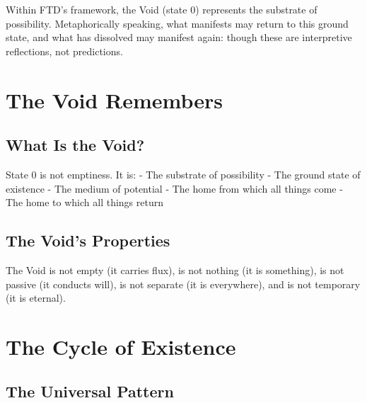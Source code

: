 \documentclass[
  11pt,
  letterpaper,
  twoside,
  openright]{book}
\begin{document}
\begin{tcolorbox}[enhanced jigsaw, leftrule=.75mm, title=\textcolor{quarto-callout-note-color}{\faInfo}\hspace{0.5em}{Key Reflection}, bottomrule=.15mm, opacityback=0, coltitle=black, arc=.35mm, colframe=quarto-callout-note-color-frame, colbacktitle=quarto-callout-note-color!10!white, colback=white, titlerule=0mm, breakable, bottomtitle=1mm, toptitle=1mm, rightrule=.15mm, toprule=.15mm, left=2mm, opacitybacktitle=0.6]

Within FTD's framework, the Void (state 0) represents the substrate of
possibility. Metaphorically speaking, what manifests may return to this
ground state, and what has dissolved may manifest again: though these
are interpretive reflections, not predictions.

\end{tcolorbox}

\section{The Void Remembers}\label{the-void-remembers}

\subsection{What Is the Void?}\label{what-is-the-void}

State 0 is not emptiness. It is: - The substrate of possibility - The
ground state of existence - The medium of potential - The home from
which all things come - The home to which all things return

\subsection{The Void's Properties}\label{the-voids-properties}

The Void is not empty (it carries flux), is not nothing (it is
something), is not passive (it conducts will), is not separate (it is
everywhere), and is not temporary (it is eternal).

\section{The Cycle of Existence}\label{the-cycle-of-existence}

\subsection{The Universal Pattern}\label{the-universal-pattern}
\end{document}
